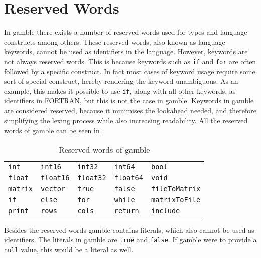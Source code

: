 \section{Reserved Words}
\label{sec:reserved_words}
In \gls{gamble} there exists a number of reserved words used for types and language constructs among others.
These reserved words, also known as language keywords, cannot be used as identifiers in the language. However, keywords are not always reserved words.
This is because keywords such as \texttt{if} and \texttt{for} are often followed by a specific construct.
In fact most cases of keyword usage require some sort of special construct, hereby rendering the keyword unambiguous.
As an example, this makes it possible to use \texttt{if}, along with all other keywords, as identifiers in FORTRAN, but this is not the case in \gls{gamble}.\citep{fortran_identifiers}
Keywords in \gls{gamble} are considered reserved, because it minimises the lookahead needed, and therefore simplifying the lexing process while also increasing readability.
All the reserved words of \gls{gamble} can be seen in .
\begin{table}[h!]
	\centering
	\def\arraystretch{1.5} \setlength{\tabcolsep}{2em}
	\begin{tabular}{l l l l l}
        \texttt{int}     & \texttt{int16}     & \texttt{int32}     & \texttt{int64}     & \texttt{bool}    \\
        \texttt{float}   & \texttt{float16}   & \texttt{float32}   & \texttt{float64}   & \texttt{void}    \\
        \texttt{matrix}  & \texttt{vector}    & \texttt{true}      & \texttt{false}     & \texttt{fileToMatrix} \\
        \texttt{if}      & \texttt{else}      & \texttt{for}       & \texttt{while}     & \texttt{matrixToFile} \\
        \texttt{print}   & \texttt{rows}      & \texttt{cols}      & \texttt{return}    & \texttt{include} \\
    \end{tabular}
    \caption{Reserved words of \gls{gamble}}\label{res:words}
	\def\arraystretch{1}
\end{table}

Besides the reserved words \gls{gamble} contains literals, which also cannot be used as identifiers.
The literals in \gls{gamble} are \texttt{true} and \texttt{false}.
If \gls{gamble} were to provide a \texttt{null} value, this would be a literal as well.

